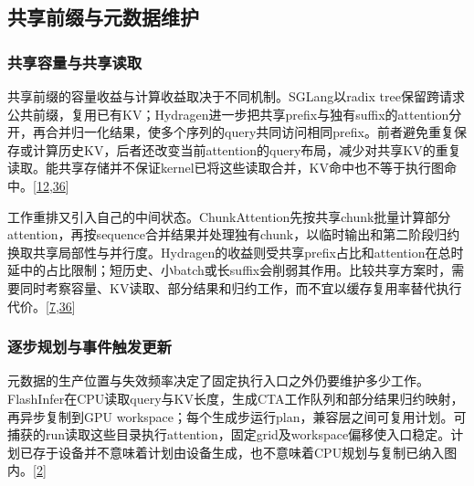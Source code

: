 \documentclass[
  UTF8,
  zihao=5]{ctexart}
\begin{document}
\hypertarget{ux5171ux4eabux524dux7f00ux4e0eux5143ux6570ux636eux7ef4ux62a4}{%
\subsection{共享前缀与元数据维护}\label{ux5171ux4eabux524dux7f00ux4e0eux5143ux6570ux636eux7ef4ux62a4}}

\hypertarget{ux5171ux4eabux5bb9ux91cfux4e0eux5171ux4eabux8bfbux53d6}{%
\subsubsection{共享容量与共享读取}\label{ux5171ux4eabux5bb9ux91cfux4e0eux5171ux4eabux8bfbux53d6}}

共享前缀的容量收益与计算收益取决于不同机制。SGLang以radix
tree保留跨请求公共前缀，复用已有KV；Hydragen进一步把共享prefix与独有suffix的attention分开，再合并归一化结果，使多个序列的query共同访问相同prefix。前者避免重复保存或计算历史KV，后者还改变当前attention的query布局，减少对共享KV的重复读取。能共享存储并不保证kernel已将这些读取合并，KV命中也不等于执行图命中。{[}\protect\hyperlink{ref-zheng2024sglang}{12},\protect\hyperlink{ref-juravsky2024hydragen}{36}{]}

工作重排又引入自己的中间状态。ChunkAttention先按共享chunk批量计算部分attention，再按sequence合并结果并处理独有chunk，以临时输出和第二阶段归约换取共享局部性与并行度。Hydragen的收益则受共享prefix占比和attention在总时延中的占比限制；短历史、小batch或长suffix会削弱其作用。比较共享方案时，需要同时考察容量、KV读取、部分结果和归约工作，而不宜以缓存复用率替代执行代价。{[}\protect\hyperlink{ref-ye2024chunkattention}{7},\protect\hyperlink{ref-juravsky2024hydragen}{36}{]}

\hypertarget{ux9010ux6b65ux89c4ux5212ux4e0eux4e8bux4ef6ux89e6ux53d1ux66f4ux65b0}{%
\subsubsection{逐步规划与事件触发更新}\label{ux9010ux6b65ux89c4ux5212ux4e0eux4e8bux4ef6ux89e6ux53d1ux66f4ux65b0}}

元数据的生产位置与失效频率决定了固定执行入口之外仍要维护多少工作。FlashInfer在CPU读取query与KV长度，生成CTA工作队列和部分结果归约映射，再异步复制到GPU
workspace；每个生成步运行plan，兼容层之间可复用计划。可捕获的run读取这些目录执行attention，固定grid及workspace偏移使入口稳定。计划已存于设备并不意味着计划由设备生成，也不意味着CPU规划与复制已纳入图内。{[}\protect\hyperlink{ref-ye2025flashinfer}{2}{]}
\end{document}
